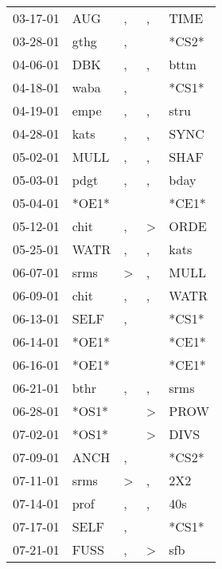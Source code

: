 \begin{supertabular}{lllll}
 03-17-01 &    AUG &                , &                , &   TIME \\
 03-28-01 &   gthg &                , &                  &  *CS2* \\
 04-06-01 &    DBK &                , &                , &   bttm \\
 04-18-01 &   waba &                , &                  &  *CS1* \\
 04-19-01 &   empe &                , &                , &   stru \\
 04-28-01 &   kats &                , &                , &   SYNC \\
 05-02-01 &   MULL &                , &                , &   SHAF \\
 05-03-01 &   pdgt &                , &                , &   bday \\
 05-04-01 &  *OE1* &                  &                  &  *CE1* \\
 05-12-01 &   chit &                , &     \textgreater &   ORDE \\
 05-25-01 &   WATR &                , &                , &   kats \\
 06-07-01 &   srms &     \textgreater &                , &   MULL \\
 06-09-01 &   chit &                , &                , &   WATR \\
 06-13-01 &   SELF &                , &                  &  *CS1* \\
 06-14-01 &  *OE1* &                  &                  &  *CE1* \\
 06-16-01 &  *OE1* &                  &                  &  *CE1* \\
 06-21-01 &   bthr &                , &                , &   srms \\
 06-28-01 &  *OS1* &                  &     \textgreater &   PROW \\
 07-02-01 &  *OS1* &                  &     \textgreater &   DIVS \\
 07-09-01 &   ANCH &                , &                  &  *CS2* \\
 07-11-01 &   srms &     \textgreater &                , &    2X2 \\
 07-14-01 &   prof &                , &                , &    40s \\
 07-17-01 &   SELF &                , &                  &  *CS1* \\
 07-21-01 &   FUSS &                , &     \textgreater &    sfb \\

\end{supertabular}

